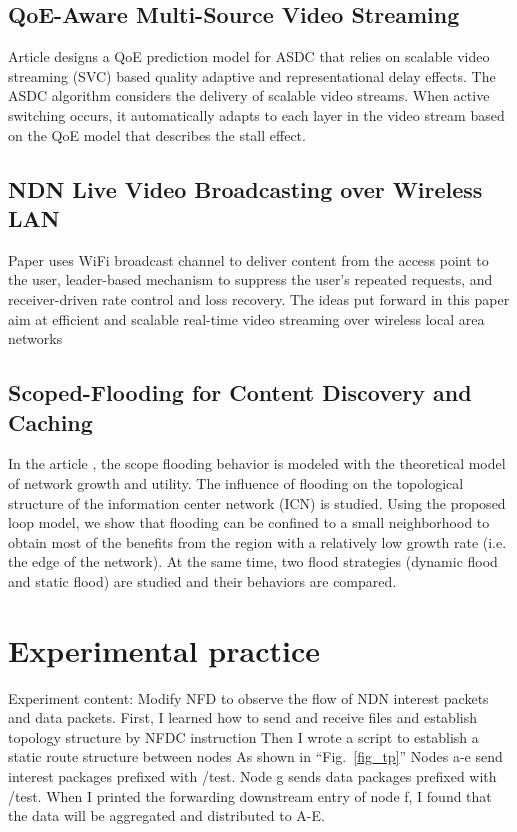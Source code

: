 \documentclass[conference]{IEEEtran}
\begin{document}
\subsection{QoE-Aware Multi-Source Video Streaming}
Article \cite{b3} designs a QoE prediction model for ASDC that relies on scalable video streaming (SVC) based quality adaptive and representational delay effects. The ASDC algorithm considers the delivery of scalable video streams. When active switching occurs, it automatically adapts to each layer in the video stream based on the QoE model that describes the stall effect.

\subsection{NDN Live Video Broadcasting over Wireless LAN}
Paper \cite{b4} uses WiFi broadcast channel to deliver content from the access point to the user, leader-based mechanism to suppress the user's repeated requests, and receiver-driven rate control and loss recovery.
The ideas put forward in this paper aim at efficient and scalable real-time video streaming over wireless local area networks

\subsection{Scoped-Flooding for Content Discovery and Caching}
In the article  \cite{b5}, the scope flooding behavior is modeled with the theoretical model of network growth and utility. The influence of flooding on the topological structure of the information center network (ICN) is studied. Using the proposed loop model, we show that flooding can be confined to a small neighborhood to obtain most of the benefits from the region with a relatively low growth rate (i.e. the edge of the network). At the same time, two flood strategies (dynamic flood and static flood) are studied and their behaviors are compared.
\section{Experimental practice}
Experiment content: Modify NFD to observe the flow of NDN interest packets and data packets. First, I learned how to send and receive files and establish topology structure by NFDC instruction
Then I wrote a script  to establish  a static route structure between nodes
As shown in ``Fig.~\ref{fig_tp}''
Nodes a-e send interest packages prefixed with /test. Node g sends data packages prefixed with /test. When I printed the forwarding downstream entry of node f, I found that the data will be aggregated and distributed to A-E.
\end{document}
